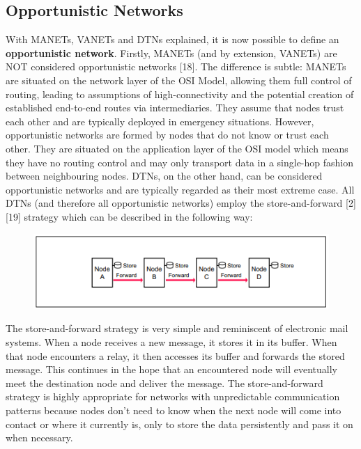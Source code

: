 \documentclass{article}
\begin{document}
\subsection{Opportunistic Networks}
With MANETs, VANETs and DTNs explained, it is now possible to define an \textbf{opportunistic network}. Firstly, MANETs (and by extension, VANETs) are NOT considered opportunistic networks [18]. The difference is subtle: MANETs are situated on the network layer of the OSI Model, allowing them full control of routing, leading to assumptions of high-connectivity and the potential creation of established end-to-end routes via intermediaries. They assume that nodes trust each other and are typically deployed in emergency situations. However, opportunistic networks are formed by nodes that do not know or trust each other. They are situated on the application layer of the OSI model which means they have no routing control and may only transport data in a single-hop fashion between neighbouring nodes. DTNs, on the other hand, can be considered opportunistic networks and are typically regarded as their most extreme case. All DTNs (and therefore all opportunistic networks) employ the store-and-forward [2][19] strategy which can be described in the following way:

\begin{figure}[h!]
\captionsetup{justification=centering, font=footnotesize}
\centering
  \includegraphics[width=.75\linewidth]{Screenshots/StoreAndForward.png}
  \label{fig:test1}
\end{figure}

\noindent The store-and-forward strategy is very simple and reminiscent of electronic mail systems. When a node receives a new message, it stores it in its buffer. When that node encounters a relay, it then accesses its buffer and forwards the stored message. This continues in the hope that an encountered node will eventually meet the destination node and deliver the message. The store-and-forward strategy is highly appropriate for networks with unpredictable communication patterns because nodes don't need to know when the next node will come into contact or where it currently is, only to store the data persistently and pass it on when necessary.
\end{document}
